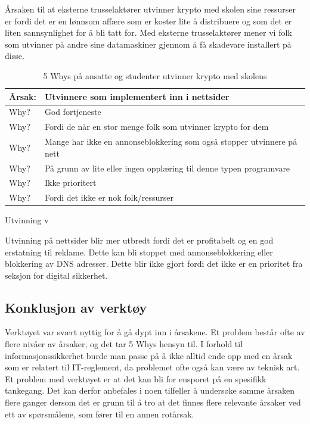 Årsaken til at eksterne trusselaktører utvinner krypto med skolen sine ressurser er fordi det er en lønnsom affære som er koster lite å distribuere og som det er liten sannsynlighet for å bli tatt for. Med eksterne trusselaktører mener vi folk som utvinner på andre sine datamaskiner gjennom å få skadevare installert på disse.

\begin{table} [H]
    \centering
    \begin{tabular}{ | m{5em} | m{30em} | }
        \hline
            \cellcolor{yellow} Årsak: & \cellcolor{yellow} Utvinnere som implementert inn i nettsider              \\
        \hline
            Why? & God fortjeneste                                   \\
        \hline
            Why? & Fordi de når en stor menge folk som utvinner krypto for dem                                           \\
        \hline
            Why? & Mange har ikke en annonseblokkering som også stopper utvinnere på nett               \\
        \hline
            Why? & På grunn av lite eller ingen opplæring til denne typen programvare           \\
        \hline
            Why? & Ikke prioritert    \\
        \hline
            Why? & Fordi det ikke er nok folk/ressurser    \\
        \hline
    \end{tabular}
    \caption[5 Whys: Minere som er implementert inn i nettsider]{5 Whys på ansatte og studenter utvinner krypto med skolens}
    \label{5Whys-minere}
\end{table}
Utvinning v

Utvinning på nettsider blir mer utbredt fordi det er profitabelt og en god erstatning til reklame. Dette kan bli stoppet med annonseblokkering eller blokkering av DNS adresser. Dette blir ikke gjort fordi det ikke er en prioritet fra seksjon for digital sikkerhet.


\subsection{Konklusjon av verktøy}
Verktøyet var svært nyttig for å gå dypt inn i årsakene. Et problem består ofte av flere nivåer av årsaker, og det tar 5 Whys hensyn til. I forhold til informasjonssikkerhet burde man passe på å ikke alltid ende opp med en årsak som er relatert til IT-reglement, da problemet ofte også kan være av teknisk art. Et problem med verktøyet er at det kan bli for ensporet på en spesifikk tankegang. Det kan derfor anbefales i noen tilfeller å undersøke samme årsaken flere ganger dersom det er grunn til å tro at det finnes flere relevante årsaker ved ett av spørsmålene, som fører til en annen rotårsak.

